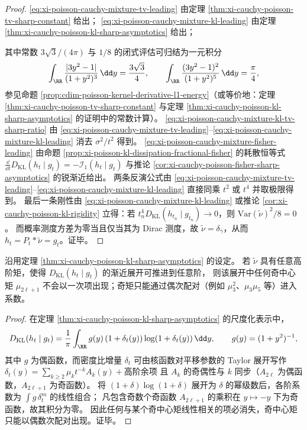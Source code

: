 \begin{proof}
\eqref{eq:xi-poisson-cauchy-mixture-tv-leading} 由定理 \ref{thm:xi-cauchy-poisson-tv-sharp-constant} 给出；
\eqref{eq:xi-poisson-cauchy-mixture-kl-leading} 由定理 \ref{thm:xi-cauchy-poisson-kl-sharp-asymptotics} 给出；
\par
其中常数 \(3\sqrt3/(4\pi)\) 与 \(1/8\) 的闭式评估可归结为一元积分
\[
\int_{\RR}\frac{|3y^2-1|}{(1+y^2)^3}\,\dd y=\frac{3\sqrt3}{4},
\qquad
\int_{\RR}\frac{(3y^2-1)^2}{(1+y^2)^5}\,\dd y=\frac{\pi}{4},
\]
参见命题 \ref{prop:cdim-poisson-kernel-derivative-l1-energy}（或等价地：定理 \ref{thm:xi-cauchy-poisson-tv-sharp-constant} 与定理 \ref{thm:xi-cauchy-poisson-kl-sharp-asymptotics} 的证明中的常数计算）。
\eqref{eq:xi-poisson-cauchy-mixture-kl-tv-sharp-ratio} 由 \eqref{eq:xi-poisson-cauchy-mixture-tv-leading}--\eqref{eq:xi-poisson-cauchy-mixture-kl-leading} 消去 \(\sigma^2/t^2\) 得到。
\eqref{eq:xi-poisson-cauchy-mixture-fisher-leading} 由命题 \ref{prop:xi-poisson-kl-dissipation-fractional-fisher} 的耗散恒等式
\(
\frac{\dd}{\dd t}D_{\mathrm{KL}}(h_t\mid g_t)=-\mathcal I_1(h_t\mid g_t)
\)
与推论 \ref{cor:xi-cauchy-poisson-fisher-sharp-asymptotics} 的锐渐近给出。
两条反演公式由 \eqref{eq:xi-poisson-cauchy-mixture-tv-leading}--\eqref{eq:xi-poisson-cauchy-mixture-kl-leading} 直接同乘 \(t^2\) 或 \(t^4\) 并取极限得到。
最后一条刚性由 \eqref{eq:xi-poisson-cauchy-mixture-kl-leading} 或推论 \ref{cor:xi-cauchy-poisson-kl-rigidity} 立得：若 \(t_n^4D_{\mathrm{KL}}(h_{t_n}\mid g_{t_n})\to 0\)，则 \(\mathrm{Var}(\tilde\nu)^2/8=0\)。
而概率测度方差为零当且仅当其为 Dirac 测度，故 \(\tilde\nu=\delta_{\bar\gamma}\)，从而 \(h_t=P_t*\tilde\nu=g_t\)。证毕。
\end{proof}

\begin{proposition}[奇中心矩的配对选择律]\label{prop:xi-cauchy-poisson-odd-moment-selection-law}
沿用定理 \ref{thm:xi-cauchy-poisson-kl-sharp-asymptotics} 的设定。
若 \(\tilde\nu\) 具有任意高阶矩，使得 \(D_{\mathrm{KL}}(h_t\mid g_t)\) 的渐近展开可推进到任意阶，
则该展开中任何奇中心矩 \(\mu_{2\ell+1}\) 不会以一次项出现；奇矩只能通过偶次配对（例如 \(\mu_3^2\)、\(\mu_3\mu_5\) 等）进入系数。
\end{proposition}
\begin{proof}
在定理 \ref{thm:xi-cauchy-poisson-kl-sharp-asymptotics} 的尺度化表示中，
\[
D_{\mathrm{KL}}(h_t\mid g_t)
=\frac{1}{\pi}\int_{\RR} g(y)\,(1+\delta_t(y))\log(1+\delta_t(y))\,\dd y,
\qquad g(y)=(1+y^2)^{-1},
\]
其中 \(g\) 为偶函数，而密度比增量 \(\delta_t\) 可由核函数对平移参数的 Taylor 展开写作
\(
\delta_t(y)=\sum_{k\ge 2}\mu_k t^{-k}A_k(y)+\text{高阶余项}
\)
且 \(A_k\) 的奇偶性与 \(k\) 同步（\(A_{2\ell}\) 为偶函数，\(A_{2\ell+1}\) 为奇函数）。
将 \((1+\delta)\log(1+\delta)\) 展开为 \(\delta\) 的幂级数后，各阶系数为 \(\int g\,\delta_t^m\) 的线性组合；
凡包含奇数个奇函数 \(A_{2\ell+1}\) 的乘积在 \(y\mapsto -y\) 下为奇函数，故其积分为零。
因此任何与某个奇中心矩线性相关的项必消失，奇中心矩只能以偶数次配对出现。证毕。
\end{proof}

